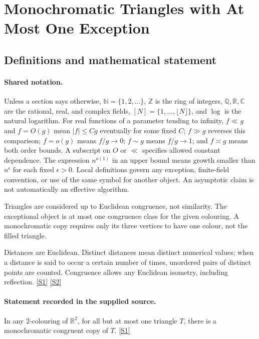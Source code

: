 \documentclass[11pt,a4paper]{article}
\newcommand{\N}{\mathbb{N}}
\newcommand{\Z}{\mathbb{Z}}
\newcommand{\Q}{\mathbb{Q}}
\newcommand{\R}{\mathbb{R}}
\newcommand{\C}{\mathbb{C}}
\newcommand{\sref}[2]{\hyperlink{source:#1:#2}{[S#2]}}
\begin{document}
\section{Monochromatic Triangles with At Most One Exception}\label{statement}


\subsection{Definitions and mathematical statement}

\paragraph{Shared notation.}Unless a section says otherwise, $\N=\{1,2,\ldots\}$,
$\Z$ is the ring of integers, $\Q,\R,\C$ are the rational, real, and complex
fields, $[N]=\{1,\ldots,\lfloor N\rfloor\}$, and $\log$ is the natural
logarithm. For real functions of a parameter tending to infinity,
$f\ll g$ and $f=O(g)$ mean $|f|\leq Cg$ eventually for some fixed $C$;
$f\gg g$ reverses this comparison; $f=o(g)$ means $f/g\to0$;
$f\sim g$ means $f/g\to1$; and $f\asymp g$ means both order bounds.
A subscript on $O$ or $\ll$ specifies allowed constant dependence.
The expression $n^{o(1)}$ in an upper bound means growth smaller than
$n^\epsilon$ for each fixed $\epsilon>0$. Local definitions govern any
exception, finite-field convention, or use of the same symbol for another
object. An asymptotic claim is not automatically an effective algorithm.



Triangles are considered up to Euclidean congruence, not similarity. The exceptional object is at most one congruence class for the given colouring. A monochromatic copy requires only its three vertices to have one colour, not the filled triangle.

Distances are Euclidean. Distinct distances mean distinct numerical values; when a distance is said to occur a certain number of times, unordered pairs of distinct points are counted. Congruence allows any Euclidean isometry, including reflection. \sref{statement}{1} \sref{statement}{2}

\paragraph{Statement recorded in the supplied source.}
In any $2$-colouring of $\mathbb{R}^2$, for all but at most one triangle $T$, there is a monochromatic congruent copy of $T$. \sref{statement}{1}
\end{document}
